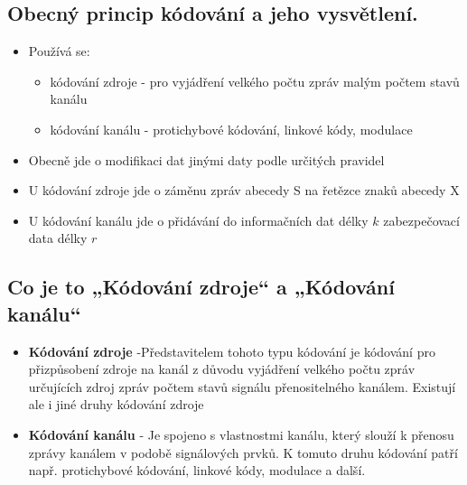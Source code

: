 \subsection{Obecný princip kódování a jeho vysvětlení.}
\begin{itemize}
    \item Používá se:
    \begin{itemize}
        \item kódování zdroje - pro vyjádření velkého počtu zpráv malým počtem stavů kanálu
        \item kódování kanálu - protichybové kódování, linkové kódy, modulace
    \end{itemize}
    \item Obecně jde o modifikaci dat jinými daty podle určitých pravidel
    \item U kódování zdroje jde o záměnu zpráv abecedy S na řetězce znaků abecedy X
    \item U kódování kanálu jde o přidávání do informačních dat délky $k$ zabezpečovací data délky $r$
\end{itemize}

\subsection{Co je to „Kódování zdroje“ a „Kódování kanálu“ }
\begin{itemize}
    \item \textbf{Kódování zdroje} -Představitelem tohoto typu kódování je kódování pro přizpůsobení zdroje na kanál z důvodu vyjádření velkého počtu zpráv určujících zdroj zpráv počtem stavů signálu přenositelného kanálem. Existují ale i jiné druhy kódování zdroje
    \item \textbf{ Kódování kanálu} - Je spojeno s vlastnostmi kanálu, který slouží k přenosu zprávy kanálem v podobě signálových prvků. K tomuto druhu kódování patří např. protichybové kódování, linkové kódy, modulace a další.
\end{itemize}

